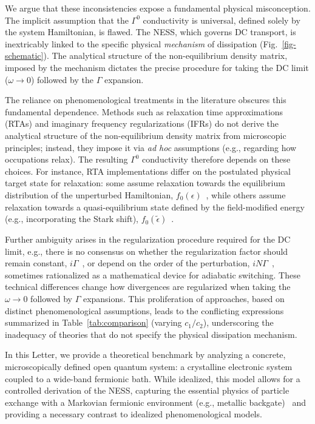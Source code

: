 \documentclass[twocolumn, prx, reprint, amsfonts, amsmath, amssymb, longbibliography, floatfix, aps]{revtex4-2}
\begin{document}
We argue that these inconsistencies expose a fundamental physical misconception. 
The implicit assumption that the $\Gamma^0$ conductivity is universal, defined solely by the system Hamiltonian, is flawed. 
The NESS, which governs DC transport, is inextricably linked to the specific physical \textit{mechanism} of dissipation (Fig.~\ref{fig-schematic}). 
The analytical structure of the non-equilibrium density matrix, imposed by the mechanism dictates the precise procedure for taking the DC limit ($\omega \to 0$) followed by the $\Gamma$ expansion.

The reliance on phenomenological treatments in the literature obscures this fundamental dependence. 
Methods such as relaxation time approximations (RTAs) and imaginary frequency regularizations (IFRs) do not derive the analytical structure of the non-equilibrium density matrix
from microscopic principles; instead, they impose it via \textit{ad hoc} assumptions (e.g., regarding how occupations relax). 
The resulting $\Gamma^0$ conductivity therefore depends on these choices. For instance, RTA implementations differ on the postulated physical target state for relaxation: some assume relaxation towards the equilibrium distribution of the unperturbed Hamiltonian, $f_0(\epsilon)$~\cite{kaplan2024unification}, while others assume relaxation towards a quasi-equilibrium state defined by the field-modified energy (e.g., incorporating the Stark shift), $f_0(\tilde{\epsilon})$~\cite{gao2014field, qiang2025clarification}.

Further ambiguity arises in the regularization procedure required for the DC limit, e.g., there is no consensus on whether the regularization factor should remain constant, $i\Gamma$~\cite{watanabe2020nonlinear,watanabe2021chiral}, or depend on the order of the perturbation, $iN\Gamma$~\cite{das2023intrinsic,kaplan2024unification,wang2024intrinsic,zhu2025magnetic}, sometimes rationalized as a mathematical device for adiabatic switching. 
These technical differences change how divergences are regularized when taking the $\omega \to 0$ followed by $\Gamma$ expansions. 
This proliferation of approaches, based on distinct phenomenological assumptions, leads to the conflicting expressions summarized in Table~\ref{tab:comparison} (varying $c_1/c_2$), underscoring the inadequacy of theories that do not specify the physical dissipation mechanism.

In this Letter, we provide a theoretical benchmark by analyzing a concrete, microscopically defined open quantum system: a crystalline electronic system coupled to a wide-band fermionic bath. 
While idealized, this model allows for a controlled derivation of the NESS, capturing the essential physics of particle exchange with a Markovian fermionic environment (e.g., metallic backgate)~\cite{seetharam2015controlled,morimoto2016topological,matsyshyn2021rabi,shi2024floquet, shi2025ultracritical,shi2023berry,matsyshyn2023fermi} and providing a necessary contrast to idealized phenomenological models.
\end{document}

